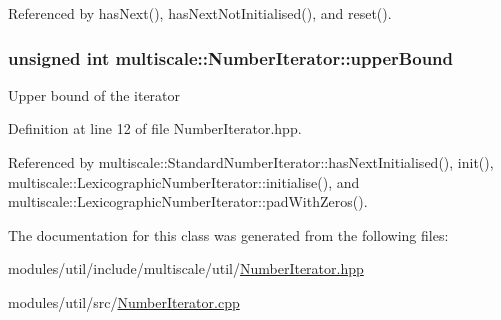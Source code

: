 Referenced by has\-Next(), has\-Next\-Not\-Initialised(), and reset().

\hypertarget{classmultiscale_1_1NumberIterator_a56a5558958778bbde64e249d67cba886}{
\subsubsection[{upper\-Bound}]{\setlength{\rightskip}{0pt plus 5cm}unsigned int multiscale\-::\-Number\-Iterator\-::upper\-Bound\hspace{0.3cm}{\ttfamily [protected]}}}\label{classmultiscale_1_1NumberIterator_a56a5558958778bbde64e249d67cba886}
Upper bound of the iterator 

Definition at line 12 of file Number\-Iterator.\-hpp.



Referenced by multiscale\-::\-Standard\-Number\-Iterator\-::has\-Next\-Initialised(), init(), multiscale\-::\-Lexicographic\-Number\-Iterator\-::initialise(), and multiscale\-::\-Lexicographic\-Number\-Iterator\-::pad\-With\-Zeros().



The documentation for this class was generated from the following files\-:\begin{DoxyCompactItemize}
\item 
modules/util/include/multiscale/util/\hyperlink{NumberIterator_8hpp}{Number\-Iterator.\-hpp}\item 
modules/util/src/\hyperlink{NumberIterator_8cpp}{Number\-Iterator.\-cpp}\end{DoxyCompactItemize}
